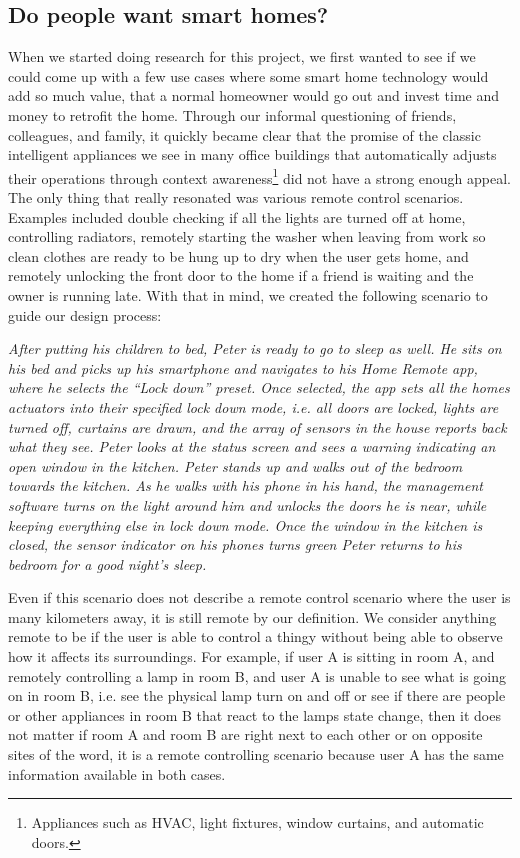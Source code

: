 \documentclass{ubicomp2012}
\begin{document}
\subsection{Do people want smart homes?}
When we started doing research for this project, we first wanted to see if we could come up with a few use cases where some smart home technology would add so much value, that a normal homeowner would go out and invest time and money to retrofit the home. Through our informal questioning of friends, colleagues, and family, it quickly became clear that the promise of the classic intelligent appliances we see in many office buildings that automatically adjusts their operations through context awareness\footnote{Appliances such as HVAC, light fixtures, window curtains, and automatic doors.} did not have a strong enough appeal. The only thing that really resonated was various remote control scenarios. Examples included double checking if all the lights are turned off at home, controlling radiators, remotely starting the washer when leaving from work so clean clothes are ready to be hung up to dry when the user gets home, and remotely unlocking the front door to the home if a friend is waiting and the owner is running late. With that in mind,  we created the following scenario to guide our design process:

\textit{After putting his children to bed, Peter is ready to go to sleep as well. He sits on his bed and picks up his smartphone and navigates to his Home Remote app, where he selects the ``Lock down'' preset. Once selected, the app sets all the homes  actuators into their specified lock down mode, i.e. all doors are locked, lights are turned off, curtains are drawn, and the array of sensors in the house reports back what they see. Peter looks at the status screen and sees a warning indicating an open window in the kitchen. Peter stands up and walks out of the bedroom towards the kitchen. As he walks with his phone in his hand, the management software turns on the light around him and unlocks the doors he is near, while keeping everything else in lock down mode. Once the window in the kitchen is closed, the sensor indicator on his phones turns green Peter returns to his bedroom for a good night's sleep.}

Even if this scenario does not describe a remote control scenario where the user is many kilometers away, it is still remote by our definition. We consider anything remote to be if the user is able to control a thingy without being able to observe how it affects its surroundings. For example,  if user A is sitting in room A, and remotely controlling a lamp in room B, and user A is unable to see what is going on in room B, i.e. see the physical lamp turn on and off or see if there are people or other appliances in room B that react to the lamps state change, then it does not matter if room A and room B are right next to each other or on opposite sites of the word, it is a remote controlling scenario because user A has the same information available in both cases.
\end{document}
